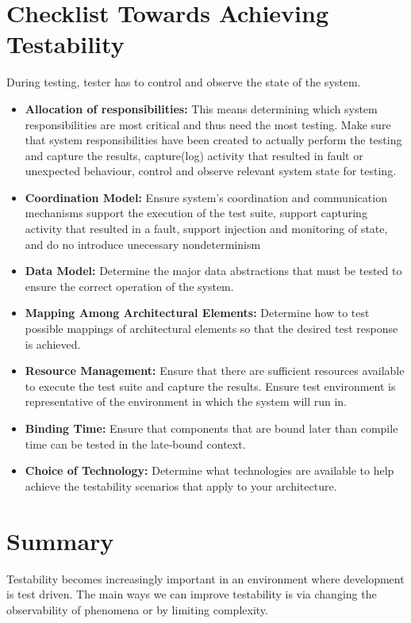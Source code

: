 \documentclass{report}
\begin{document}
\section{Checklist Towards Achieving Testability}
During testing, tester has to control and observe the state of the system.

\begin{itemize}
\item
\textbf{Allocation of responsibilities:}
This means determining which system responsibilities are most critical and thus need the most testing.
Make sure that system responsibilities have been created to actually perform the testing and capture the results, capture(log) activity that resulted in fault or unexpected behaviour, control and observe relevant system state for testing.

\item
\textbf{Coordination Model:}
Ensure system's coordination and communication mechanisms
support the execution of the test suite,
support capturing activity that resulted in a fault,
support injection and monitoring of state, and
do no introduce unecessary nondeterminism

\item
\textbf{Data Model:}
Determine the major data abstractions that must be tested to ensure the correct operation of the system.

\item
\textbf{Mapping Among Architectural Elements:}
Determine how to test possible mappings of architectural elements so that the desired test response is achieved.

\item
\textbf{Resource Management:}
Ensure that there are sufficient resources available to execute the test suite and capture the results. 
Ensure test environment is representative of the environment in which the system will run in.

\item
\textbf{Binding Time:}
Ensure that components that are bound later than compile time can be tested in the late-bound context.

\item
\textbf{Choice of Technology:}
Determine what technologies are available to help achieve the testability scenarios that apply to your architecture. 
\end{itemize}

\section{Summary}
Testability becomes increasingly important in an environment where development is test driven. The main ways we can improve testability is via changing the observability of phenomena or by limiting complexity.
\end{document}
